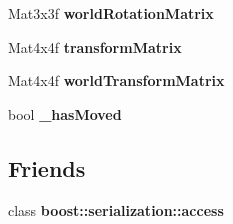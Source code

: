\begin{DoxyCompactItemize}
\item 
\hypertarget{class_transform_a0f8cf1d6d75de8543ab60feda8512f4f}{
Mat3x3f {\bfseries worldRotationMatrix}}
\label{class_transform_a0f8cf1d6d75de8543ab60feda8512f4f}

\item 
\hypertarget{class_transform_a2926f621763bb09c31e3507cc2446289}{
Mat4x4f {\bfseries transformMatrix}}
\label{class_transform_a2926f621763bb09c31e3507cc2446289}

\item 
\hypertarget{class_transform_a6d68c18e11ae927154ba5a539f1bf014}{
Mat4x4f {\bfseries worldTransformMatrix}}
\label{class_transform_a6d68c18e11ae927154ba5a539f1bf014}

\item 
\hypertarget{class_transform_a5df3356b2241cad2e6dec0ccf4baee44}{
bool {\bfseries \_\-hasMoved}}
\label{class_transform_a5df3356b2241cad2e6dec0ccf4baee44}

\end{DoxyCompactItemize}
\subsection*{Friends}
\begin{DoxyCompactItemize}
\item 
\hypertarget{class_transform_ac98d07dd8f7b70e16ccb9a01abf56b9c}{
class {\bfseries boost::serialization::access}}
\label{class_transform_ac98d07dd8f7b70e16ccb9a01abf56b9c}

\end{DoxyCompactItemize}


